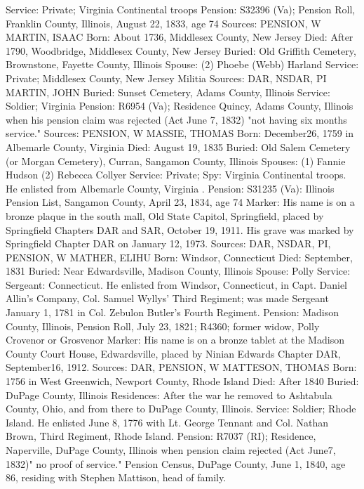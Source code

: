 Service: Private; Virginia Continental troops 
Pension: S32396 (Va); Pension Roll, Franklin County, Illinois, August 22, 1833, age 74 
Sources: PENSION, W 
MARTIN, ISAAC
Born: About 1736, Middlesex County, New Jersey
Died: After 1790, Woodbridge, Middlesex County, New Jersey
Buried: Old Griffith Cemetery, Brownstone, Fayette County, Illinois
Spouse: (2) Phoebe (Webb) Harland
Service: Private; Middlesex County, New Jersey Militia
Sources: DAR, NSDAR, PI 
MARTIN, JOHN 
Buried: Sunset Cemetery, Adams County, Illinois 
Service: Soldier; Virginia 
Pension: R6954 (Va); Residence Quincy, Adams County, Illinois when his pension claim was rejected (Act June 7, 1832) "not having six months service."
Sources: PENSION, W 
MASSIE, THOMAS
Born: December26, 1759 in Albemarle County, Virginia Died: August 19, 1835
Buried: Old Salem Cemetery (or Morgan Cemetery), Curran, Sangamon County, Illinois
Spouses: (1) Fannie Hudson
	 (2) Rebecca Collyer 
Service: Private; Spy: Virginia Continental troops. He enlisted from Albemarle County, Virginia .
Pension: S31235 (Va): Illinois Pension List, Sangamon County, April 23, 1834, age 74 
Marker: His name is on a bronze plaque in the south mall, Old State Capitol, Springfield, placed by Springfield Chapters DAR and SAR, October 19, 1911. His grave was marked by Springfield Chapter DAR on January 12, 1973. 
Sources: DAR, NSDAR, PI, PENSION, W 
MATHER, ELIHU
Born: Windsor, Connecticut
Died: September, 1831
Buried: Near Edwardsville, Madison County, Illinois
Spouse: Polly
Service: Sergeant: Connecticut. He enlisted from Windsor, Connecticut, in Capt. 
Daniel Allin's Company, Col. Samuel Wyllys' Third Regiment; was made Sergeant January 1, 1781 in Col. Zebulon Butler's Fourth Regiment.
Pension: Madison County, Illinois, Pension Roll, July 23, 1821; R4360; former widow, Polly Crovenor or Grosvenor
Marker: His name is on a bronze tablet at the Madison County Court House, Edwardsville, placed by Ninian Edwards Chapter DAR, September16, 1912.
Sources: DAR, PENSION, W 
MATTESON, THOMAS 
Born: 1756 in West Greenwich, Newport County, Rhode Island
Died: After 1840
Buried: DuPage County, Illinois
Residences: After the war he removed to Ashtabula County, Ohio, and from there to DuPage County, Illinois.
Service: Soldier; Rhode Island. He enlisted June 8, 1776 with Lt. George Tennant and Col. Nathan Brown, Third Regiment, Rhode Island.
Pension: R7037 (RI); Residence, Naperville, DuPage County, Illinois when pen­sion claim rejected (Act June7, 1832)" no proof of service." Pension Census, DuPage County, June 1, 1840,  age 86, residing with Stephen Mattison, head of family.
